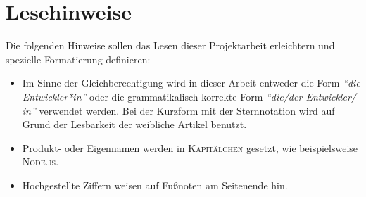 \chapter*{Lesehinweise}
Die folgenden Hinweise sollen das Lesen dieser Projektarbeit erleichtern und spezielle Formatierung definieren:

\begin{itemize}
	\item Im Sinne der Gleichberechtigung wird in dieser Arbeit entweder die Form \textit{\enquote{die Entwickler*in}} oder die grammatikalisch korrekte Form \textit{\enquote{die/der Entwickler/-in}} verwendet werden. Bei der Kurzform mit der Sternnotation wird auf Grund der Lesbarkeit der weibliche Artikel benutzt.
	\item Produkt- oder Eigennamen werden in \textsc{Kapitälchen} gesetzt, wie beispielsweise \textsc{Node.js}.
	\item Hochgestellte Ziffern weisen auf Fußnoten am Seitenende hin.
	
\end{itemize}
 